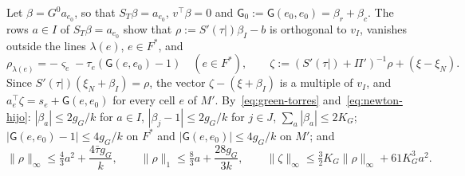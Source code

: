 Let $\beta=G^0a_{e_0}$, so that $S_T\beta=a_{e_0}$, $v^\top\beta=0$ and $\mathsf G_0:=\mathsf
G(e_0,e_0)=\beta_r+\beta_c$. The rows $a\in I$ of $S_T\beta=a_{e_0}$ show that
$\rho:=S'(\tau|)\beta_I-b$ is orthogonal to $v_I$, vanishes outside the lines $\lambda(e)$, $e\in F^*$,
and
\begin{equation}\label{eq:rho-hijo}
 \rho_{\lambda(e)}=-\varsigma_e-\tau_e(\mathsf G(e,e_0)-1)\quad(e\in F^*),\qquad
 \zeta:=(S'(\tau|)+\Pi')^{-1}\rho+(\xi-\xi_N).
\end{equation}
Since $S'(\tau|)(\xi_N+\beta_I)=\rho$, the vector $\zeta-(\xi+\beta_I)$ is a multiple of $v_I$, and
$a_e^\top\zeta=s_e+\mathsf G(e,e_0)$ for every cell $e$ of $M'$. By~\eqref{eq:green-torres}
and~\eqref{eq:newton-hijo}: $|\beta_a|\le2g_G/k$ for $a\in I$, $|\beta_j-1|\le2g_G/k$ for $j\in J$,
$\sum_a|\beta_a|\le2K_G$; $|\mathsf G(e,e_0)-1|\le4g_G/k$ on $F^*$ and $|\mathsf G(e,e_0)|\le4g_G/k$ on
$M'$; and
\begin{equation}\label{eq:cotas-hijo}
 \|\rho\|_\infty\le\tfrac43a^2+\frac{4\bar\tau g_G}k,\qquad
 \|\rho\|_1\le\tfrac83a+\frac{28g_G}{3k},\qquad
 \|\zeta\|_\infty\le\tfrac32K_G\|\rho\|_\infty+61K_G^3a^2 .
\end{equation}

